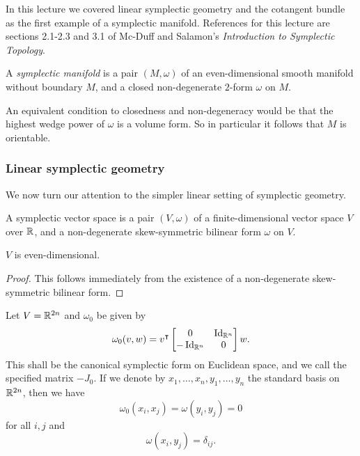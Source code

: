 In this lecture we covered linear symplectic geometry and the cotangent bundle as the first example of a symplectic manifold.
References for this lecture are sections 2.1-2.3 and 3.1 of Mc-Duff and Salamon's \emph{Introduction to Symplectic Topology}.

\begin{dfn}
    A \emph{symplectic manifold} is a pair $(M,\omega)$ of an even-dimensional smooth manifold without boundary $M$, and a closed non-degenerate $2$-form $\omega$ on $M$. 
\end{dfn}

An equivalent condition to closedness and non-degeneracy would be that the highest wedge power of $\omega$ is a volume form.
So in particular it follows that $M$ is orientable.

\subsubsection*{Linear symplectic geometry}
We now turn our attention to the simpler linear setting of symplectic geometry.

\begin{dfn}
    A symplectic vector space is a pair $(V,\omega)$ of a finite-dimensional vector space $V$ over $\mathbb{R}$, and a non-degenerate skew-symmetric bilinear form $\omega$ on $V$.
\end{dfn}

\begin{prop}
    $V$ is even-dimensional.
\end{prop}

\begin{proof}
    This follows immediately from the existence of a non-degenerate skew-symmetric bilinear form.
\end{proof}

\begin{example}
    Let $V=\mathbb{R}^{2n}$ and $\omega_0$ be given by
    \[\omega_0(v,w)=v^\intercal\begin{bmatrix}
        0&\operatorname{Id}_{\mathbb{R}^n}\\-\operatorname{Id}_{\mathbb{R}^n}&0
    \end{bmatrix}w.\]
    This shall be the canonical symplectic form on Euclidean space, and we call the specified matrix $-J_0$.
    If we denote by $x_1,\ldots,x_n,y_1,\ldots,y_n$ the standard basis on $\mathbb{R}^{2n}$, then we have
    \[\omega_0(x_i,x_j)=\omega(y_i,y_j)=0\]
    for all $i,j$ and
    \[\omega(x_i,y_j)=\delta_{ij}.\]
\end{example}

